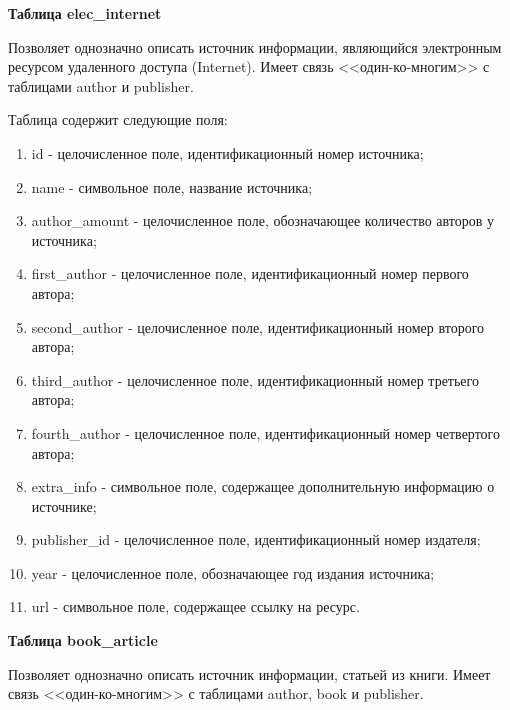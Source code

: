 \hfill \break

{\bf Таблица elec\_internet}

Позволяет однозначно описать источник информации, являющийся электронным ресурсом удаленного доступа (Internet). Имеет связь <<один-ко-многим>> с таблицами author и publisher. 


Таблица содержит следующие поля:
\begin{enumerate}
	\item id - целочисленное поле, идентификационный номер источника;
	\item name - символьное поле, название источника;
	\item author\_amount - целочисленное поле, обозначающее количество авторов у источника;
	\item first\_author - целочисленное поле, идентификационный номер первого автора;
	\item second\_author - целочисленное поле, идентификационный номер второго автора;
	\item third\_author - целочисленное поле, идентификационный номер третьего автора;
	\item fourth\_author - целочисленное поле, идентификационный номер четвертого автора;
	\item extra\_info - символьное поле, содержащее дополнительную информацию о источнике;
	\item publisher\_id - целочисленное поле, идентификационный номер издателя;
	\item year - целочисленное поле, обозначающее год издания источника;
	\item url - символьное поле, содержащее ссылку на ресурс.
\end{enumerate}

\hfill \break

{\bf Таблица book\_article}

Позволяет однозначно описать источник информации, статьей из книги. Имеет связь <<один-ко-многим>> с таблицами author, book и publisher. 


